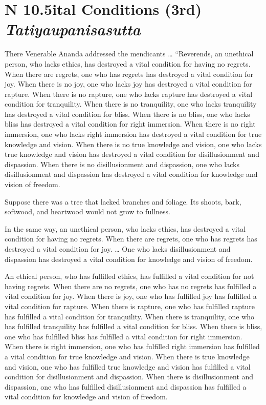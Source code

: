 \documentclass[12pt,openany]{book}%
\newcommand*{\suttatitleacronym}[1]{\smaller[2]{#1}\vspace*{.3em}}
\newcommand*{\suttatitletranslation}[1]{\linebreak{#1}}
\newcommand*{\suttatitleroot}[1]{\linebreak\smaller[2]\itshape{#1}}
\newcommand*{\tocacronym}[1]{\hspace*{-3.3em}{#1}\quad}
\newcommand*{\toctranslation}[1]{#1}
\newcommand*{\tocroot}[1]{(\textit{#1})}
\begin{document}
%
\section*{{\suttatitleacronym AN 10.5}{\suttatitletranslation Vital Conditions (3rd) }{\suttatitleroot Tatiyaupanisasutta}}
\addcontentsline{toc}{section}{\tocacronym{AN 10.5} \toctranslation{Vital Conditions (3rd) } \tocroot{Tatiyaupanisasutta}}

There Venerable Ānanda addressed the mendicants … “Reverends, an unethical person, who lacks ethics, has destroyed a vital condition for having no regrets. When there are regrets, one who has regrets has destroyed a vital condition for joy. When there is no joy, one who lacks joy has destroyed a vital condition for rapture. When there is no rapture, one who lacks rapture has destroyed a vital condition for tranquility. When there is no tranquility, one who lacks tranquility has destroyed a vital condition for bliss. When there is no bliss, one who lacks bliss has destroyed a vital condition for right immersion. When there is no right immersion, one who lacks right immersion has destroyed a vital condition for true knowledge and vision. When there is no true knowledge and vision, one who lacks true knowledge and vision has destroyed a vital condition for disillusionment and dispassion. When there is no disillusionment and dispassion, one who lacks disillusionment and dispassion has destroyed a vital condition for knowledge and vision of freedom. 

Suppose there was a tree that lacked branches and foliage. Its shoots, bark, softwood, and heartwood would not grow to fullness. 

In the same way, an unethical person, who lacks ethics, has destroyed a vital condition for having no regrets. When there are regrets, one who has regrets has destroyed a vital condition for joy. … One who lacks disillusionment and dispassion has destroyed a vital condition for knowledge and vision of freedom. 

An ethical person, who has fulfilled ethics, has fulfilled a vital condition for not having regrets. When there are no regrets, one who has no regrets has fulfilled a vital condition for joy. When there is joy, one who has fulfilled joy has fulfilled a vital condition for rapture. When there is rapture, one who has fulfilled rapture has fulfilled a vital condition for tranquility. When there is tranquility, one who has fulfilled tranquility has fulfilled a vital condition for bliss. When there is bliss, one who has fulfilled bliss has fulfilled a vital condition for right immersion. When there is right immersion, one who has fulfilled right immersion has fulfilled a vital condition for true knowledge and vision. When there is true knowledge and vision, one who has fulfilled true knowledge and vision has fulfilled a vital condition for disillusionment and dispassion. When there is disillusionment and dispassion, one who has fulfilled disillusionment and dispassion has fulfilled a vital condition for knowledge and vision of freedom. 
\end{document}
